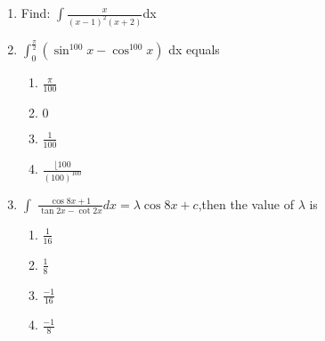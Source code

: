 \begin{enumerate}
\item Find:
$\int {\frac{x}{(x-1)^2(x+2)}} $dx
      
\item  $\int_{0}^{\frac{\pi}{2}} (\sin^{100} x-\cos^{100} x)$ dx equals
\begin{enumerate}
\item  ${\frac{\pi}{100}}$
\item $0$
\item ${\frac{1}{100}}$
\item  ${\frac{\lfloor 100} {(100)^{100}}}$ 
\end{enumerate}

\item $\int$ ${\frac{\cos 8x+1}{\tan 2x- \cot 2x}} dx= \lambda \cos 8x+c $,then the value of $\lambda$  is
\begin{enumerate}
\item  ${\frac{1}{16}}$
\item  ${\frac{1}{8}}$
\item  ${\frac{-1}{16}}$
\item  ${\frac{-1}{8}}$
\end{enumerate}

\end{enumerate}

